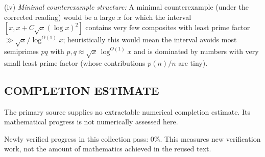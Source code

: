 (iv) \emph{Minimal counterexample structure:} A minimal counterexample (under the corrected reading) would be a large $x$ for which the interval $[x,x+C\sqrt{x}(\log x)^2]$ contains very few composites with least prime factor $\gg \sqrt{x}/\log^{O(1)}x$; heuristically this would mean the interval avoids most semiprimes $pq$ with $p,q\approx \sqrt{x}\,\log^{O(1)}x$ and is dominated by numbers with very small least prime factor (whose contributions $p(n)/n$ are tiny).


\subsection*{COMPLETION ESTIMATE}
The primary source supplies no extractable numerical completion estimate. Its mathematical progress is not numerically assessed here.

Newly verified progress in this collection pass: $0\%$. This measures new verification work, not the amount of mathematics achieved in the reused text.
